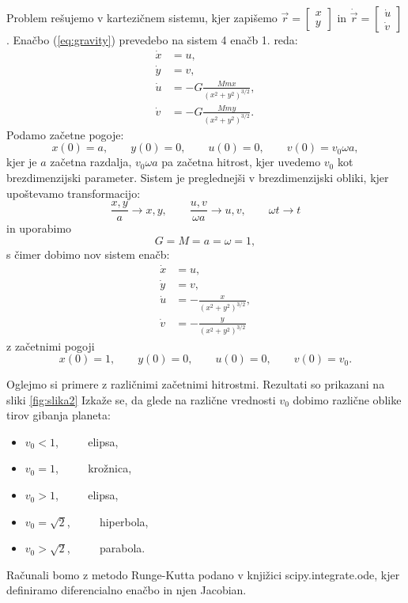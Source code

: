 \documentclass[12pt,a4paper]{article}
\begin{document}
\noindent Problem rešujemo v kartezičnem sistemu, kjer zapišemo $\vec{r}=
\begin{bmatrix}
    x \\
   y
\end{bmatrix}
$ in $\dot{\vec{r}}= \begin{bmatrix}
    \dot{u} \\
   \dot{v}
\end{bmatrix} $.
Enačbo (\ref{eq:gravity}) prevedebo na sistem 4 enačb 1. reda:
\begin{align}
 \dot{x}&= u ,\nonumber \\
 \dot{y}&=v, \nonumber \\
 \dot{u}&=-G\frac{M m x}{(x^{2} +y^{2})^{3/2}}, \nonumber \\
 \dot{v}&=-G\frac{M m y}{(x^{2} +y^{2})^{3/2}}.
\end{align}
Podamo začetne pogoje:
\begin{equation}
x(0)=a, \qquad y(0)=0, \qquad u(0)=0, \qquad v(0)=v_0 \omega a,
\end{equation}
kjer je $a$ začetna razdalja, $v_0 \omega a$ pa začetna hitrost, kjer uvedemo $v_0$ kot brezdimenzijski parameter. Sistem je preglednejši v brezdimenzijski obliki, kjer upoštevamo transformacijo:
\begin{equation}
\frac{x,y}{a} \rightarrow x,y, \qquad \frac{u,v}{\omega a} \rightarrow u,v, \qquad \omega t \rightarrow t
\end{equation}
in uporabimo \begin{equation}
G=M=a=\omega=1,
\end{equation}
s čimer dobimo nov sistem enačb:
\begin{align}
 \dot{x}&= u ,\nonumber \\
 \dot{y}&=v, \nonumber \\
 \dot{u}&=-\frac{ x}{(x^{2} +y^{2})^{3/2}}, \nonumber \\
 \dot{v}&=-\frac{ y}{(x^{2} +y^{2})^{3/2}}
\end{align}
z začetnimi pogoji 
\begin{equation}
x(0)=1, \qquad y(0)=0, \qquad u(0)=0, \qquad v(0)=v_0.
\end{equation}

Oglejmo si primere z različnimi začetnimi hitrostmi. Rezultati so prikazani na sliki \ref{fig:slika2} Izkaže se, da glede na različne vrednosti $v_0$ dobimo različne oblike tirov gibanja planeta:
\begin{itemize}
\item $v_0 < 1$, $\qquad$ elipsa,
\item $v_0 =1$, $\qquad$ krožnica,
\item $v_0 >1$, $\qquad$ elipsa,
\item $v_0=\sqrt{2}$, $\qquad$ hiperbola,
\item $v_0 > \sqrt{2}$, $\qquad$ parabola.
\end{itemize}
Računali bomo z metodo Runge-Kutta podano v knjižici \textsf{scipy.integrate.ode}, kjer definiramo diferencialno enačbo in njen Jacobian.
\end{document}
